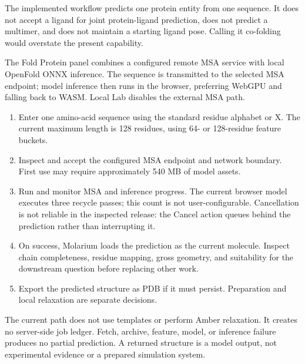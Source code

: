 \documentclass[11pt]{article}
\begin{document}

The implemented workflow predicts one protein entity from one sequence. It does not accept a ligand for joint protein-ligand prediction, does not predict a multimer, and does not maintain a starting ligand pose. Calling it co-folding would overstate the present capability.

The Fold Protein panel combines a configured remote MSA service with local OpenFold ONNX inference. The sequence is transmitted to the selected MSA endpoint; model inference then runs in the browser, preferring WebGPU and falling back to WASM. Local Lab disables the external MSA path.


\begin{enumerate}
\item Enter one amino-acid sequence using the standard residue alphabet or X. The current maximum length is 128 residues, using 64- or 128-residue feature buckets.
\item Inspect and accept the configured MSA endpoint and network boundary. First use may require approximately 540 MB of model assets.
\item Run and monitor MSA and inference progress. The current browser model executes three recycle passes; this count is not user-configurable. Cancellation is not reliable in the inspected release: the Cancel action queues behind the prediction rather than interrupting it.
\item On success, Molarium loads the prediction as the current molecule. Inspect chain completeness, residue mapping, gross geometry, and suitability for the downstream question before replacing other work.
\item Export the predicted structure as PDB if it must persist. Preparation and local relaxation are separate decisions.
\end{enumerate}

The current path does not use templates or perform Amber relaxation. It creates no server-side job ledger. Fetch, archive, feature, model, or inference failure produces no partial prediction. A returned structure is a model output, not experimental evidence or a prepared simulation system.
\end{document}
